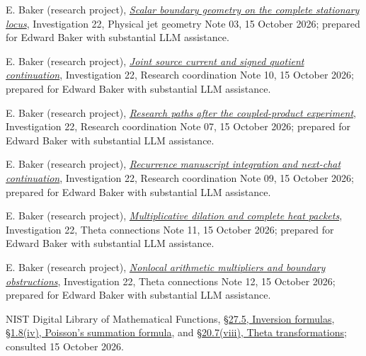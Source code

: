 \documentclass[11pt]{article}
\numberwithin{equation}{section}
\theoremstyle{definition}
\theoremstyle{remark}
\newcommand{\researchnote}[2]{\href{../../papers/investigations-2/active/22_theta_manifold_geometry/#1}{#2}}
\begin{document}
\begin{thebibliography}{99}
E. Baker (research project),
\researchnote{notes/01_physical_jet_geometry/03_SCALAR_STATIONARY_GEOMETRY_AND_INVARIANT_TRACE_20261015.md}{\emph{Scalar boundary geometry on the complete stationary locus}},
Investigation 22, Physical jet geometry Note 03, 15 October 2026;
prepared for Edward Baker with substantial LLM assistance.

E. Baker (research project),
\researchnote{notes/00_research_coordination/10_JOINT_SOURCE_CURRENT_AND_SIGNED_QUOTIENT_CONTINUATION_20261015.md}{\emph{Joint source current and signed quotient continuation}},
Investigation 22, Research coordination Note 10, 15 October 2026;
prepared for Edward Baker with substantial LLM assistance.

E. Baker (research project),
\researchnote{notes/00_research_coordination/07_RESEARCH_PATHS_AFTER_COUPLED_PRODUCT_20261015.md}{\emph{Research paths after the coupled-product experiment}},
Investigation 22, Research coordination Note 07, 15 October 2026;
prepared for Edward Baker with substantial LLM assistance.

E. Baker (research project),
\researchnote{notes/00_research_coordination/09_MANUSCRIPT_RECURRENCE_INTEGRATION_AND_NEXT_CHAT_20261015.md}{\emph{Recurrence manuscript integration and next-chat continuation}},
Investigation 22, Research coordination Note 09, 15 October 2026;
prepared for Edward Baker with substantial LLM assistance.


E. Baker (research project),
\researchnote{notes/03_theta_bundles_and_connections/11_MULTIPLICATIVE_DILATION_AND_COMPLETE_HEAT_PACKETS_20261015.md}{\emph{Multiplicative dilation and complete heat packets}},
Investigation 22, Theta connections Note 11, 15 October 2026;
prepared for Edward Baker with substantial LLM assistance.

E. Baker (research project),
\researchnote{notes/03_theta_bundles_and_connections/12_NONLOCAL_ARITHMETIC_MULTIPLIERS_AND_BOUNDARY_OBSTRUCTIONS_20261015.md}{\emph{Nonlocal arithmetic multipliers and boundary obstructions}},
Investigation 22, Theta connections Note 12, 15 October 2026;
prepared for Edward Baker with substantial LLM assistance.

NIST Digital Library of Mathematical Functions,
\href{https://dlmf.nist.gov/27.5}{\S27.5, Inversion formulas},
\href{https://dlmf.nist.gov/1.8.iv}{\S1.8(iv), Poisson's summation formula},
and \href{https://dlmf.nist.gov/20.7.viii}{\S20.7(viii), Theta transformations};
consulted 15 October 2026.

\end{thebibliography}
\end{document}
